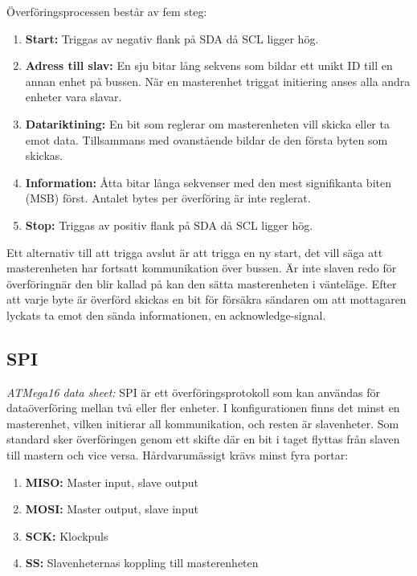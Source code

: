 \documentclass[11pt]{article}
\begin{document}
\begin{flushleft}
Överföringsprocessen består av fem steg: 

\begin{enumerate}
	\item \textbf{Start:} Triggas av negativ flank på SDA då SCL ligger hög.
	\item \textbf{Adress till slav:} En sju bitar lång sekvens som bildar ett unikt ID till en annan enhet på bussen. När en masterenhet triggat initiering anses alla andra enheter vara slavar.
	\item \textbf{Datariktining:} En bit som reglerar om masterenheten vill skicka eller ta emot data. Tillsammans med ovanstående bildar de den första byten som skickas.
	\item \textbf{Information:} Åtta bitar långa sekvenser med den mest signifikanta biten (MSB) först. Antalet bytes per överföring är inte reglerat.
	\item \textbf{Stop:} Triggas av positiv flank på SDA då SCL ligger hög.
\end{enumerate}

Ett alternativ till att trigga avslut är att trigga en ny start, det vill säga att masterenheten har fortsatt kommunikation över bussen. Är inte slaven redo för överföringnär den blir kallad på kan den sätta masterenheten i vänteläge. Efter att varje byte är överförd skickas en bit för försäkra sändaren om att mottagaren lyckats ta emot den sända informationen, en acknowledge-signal. \cite{guideI2CPhilips}

\subsection{SPI}
\textit{ATMega16 data sheet:}
SPI är ett överföringsprotokoll som kan användas för dataöverföring mellan två eller fler enheter. I konfigurationen finns det minst en masterenhet, vilken initierar all kommunikation, och resten är slavenheter. Som standard sker överföringen genom ett skifte där en bit i taget flyttas från slaven till mastern och vice versa. Hårdvarumässigt krävs minst fyra portar:

\pagebreak

\begin{enumerate}
	\item \textbf{MISO:} Master input, slave output
	\item \textbf{MOSI:} Master output, slave input
	\item \textbf{SCK:} Klockpuls
	\item \textbf{SS:} Slavenheternas koppling till masterenheten
\end{enumerate}


\end{flushleft}
\end{document}
